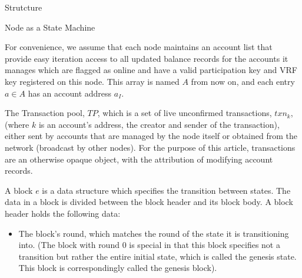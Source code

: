 \documentclass[10pt,a4paper]{article}
\begin{document}
\begin{section}{Strutcture}
\begin{subsection}{Node as a State Machine}



For convenience, we assume that each node maintains an account list that provide 
easy iteration access to all updated balance records for the accounts it manages 
which are flagged as online and have a valid participation key and VRF key
registered on this node.
This array is named $A$ from now on, and each entry $a\in A$ has an account address 
$a_I$. %

The Transaction pool, $TP$, which is a set of live unconfirmed transactions, $txn_k$, (where 
$k$ is an account's address, the creator and sender of the transaction), either
sent by accounts that are managed by the node itself or obtained from the network 
(broadcast by other nodes).
For the purpose of this article, transactions are an otherwise opaque object, with the 
attribution of modifying account records.

A {\sf block} $e$ is a data structure which specifies the transition between states.
The data in a block is divided between the block header and its block body.
A block header holds the following data:
\begin{itemize}
    \item
    The block's round, which matches the round of the state it is transitioning
    into. (The block with round 0 is special in that this block specifies not
    a transition but rather the entire initial state, which is called the genesis
    state. This block is correspondingly called the genesis block).
    

\end{itemize}
\end{subsection}
\end{section}
\end{document}

